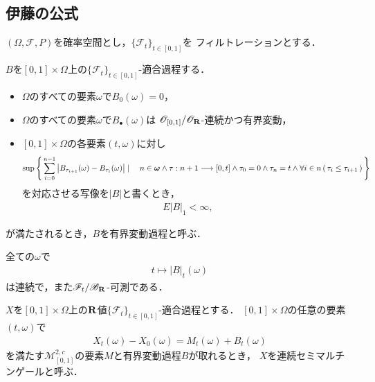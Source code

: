 \subsection{伊藤の公式}
	$(\Omega,\mathscr{F},P)$を確率空間とし，$\{\mathscr{F}_{t}\}_{t \in [0,1]}$を
	フィルトレーションとする．
	
	\begin{screen}
		\begin{dfn}[有界変動過程]
			$B$を$[0,1] \times \Omega$上の$\{\mathscr{F}_{t}\}_{t \in [0,1]}$-適合過程する．
			\begin{itemize}
				\item $\Omega$のすべての要素$\omega$で$B_{0}(\omega) = 0$，
				\item $\Omega$のすべての要素$\omega$で$B_{\bullet}(\omega)$は
					$\mathscr{O}_{[0,1]}/\mathscr{O}_{\mathbf{R}}$-連続かつ有界変動，
				\item $[0,1] \times \Omega$の各要素$(t,\omega)$に対し
					\begin{align}
						\sup{}{
							\Set{\sum_{i=0}^{n-1}\left|B_{\tau_{i+1}}(\omega) - B_{\tau_{i}}(\omega)\right|}{
								n \in \Natural \wedge \tau:n+1 \longrightarrow [0,t] \wedge
								\tau_{0} = 0 \wedge \tau_{n} = t \wedge 
								\forall i \in n\, (\, \tau_{i} \leq \tau_{i+1}\, )
							}
						}
					\end{align}
					を対応させる写像を$|B|$と書くとき，
					\begin{align}
						E|B|_{1} < \infty,
					\end{align}
			\end{itemize}
			が満たされるとき，$B$を有界変動過程と呼ぶ．
		\end{dfn}
	\end{screen}
	
	全ての$\omega$で
	\begin{align}
		t \longmapsto |B|_{t}(\omega)
	\end{align}
	は連続で，また$\mathscr{F}_{t}/\mathscr{B}_{\mathbf{R}}$-可測である．
	
	\begin{screen}
		\begin{dfn}[連続セミマルチンゲール]
			$X$を$[0,1] \times \Omega$上の$\mathbf{R}$値$\{\mathscr{F}_{t}\}_{t \in [0,1]}$-適合過程とする．
			$[0,1] \times \Omega$の任意の要素$(t,\omega)$で
			\begin{align}
				X_{t}(\omega) - X_{0}(\omega) = M_{t}(\omega) + B_{t}(\omega)
			\end{align}
			を満たす$\mathscr{M}^{2,c}_{[0,1]}$の要素$M$と有界変動過程$B$が取れるとき，
			$X$を連続セミマルチンゲールと呼ぶ．
		\end{dfn}
	\end{screen}
	
